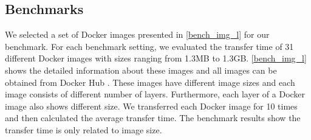 \documentclass{ieicej}
\begin{document}
\subsection{Benchmarks}
We selected a set of Docker images presented in \cref{bench_img_l} for our benchmark. For each benchmark setting, we evaluated the transfer time of 31 different Docker images with sizes ranging from 1.3MB to 1.3GB.
\cref{bench_img_l} shows the detailed information about these images and all images can be obtained from Docker Hub \cite{dockerhub2015}.
These images have different image sizes and each image consists of different number of layers.
Furthermore, each layer of a Docker image also shows different size.
We transferred each Docker image for 10 times and then calculated the average transfer time.
The benchmark results show the transfer time is only related to image size.
\end{document}
